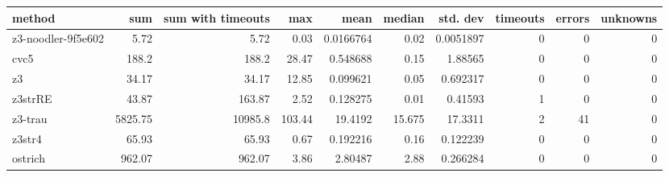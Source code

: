 \begin{tabular}{lrrrrrrrrr}
\hline
 method             &     sum &   sum with timeouts &    max &       mean &   median &   std. dev &   timeouts &   errors &   unknowns \\
\hline
 z3-noodler-9f5e602 &    5.72 &                5.72 &   0.03 &  0.0166764 &    0.02  &  0.0051897 &          0 &        0 &          0 \\
 cvc5               &  188.2  &              188.2  &  28.47 &  0.548688  &    0.15  &  1.88565   &          0 &        0 &          0 \\
 z3                 &   34.17 &               34.17 &  12.85 &  0.099621  &    0.05  &  0.692317  &          0 &        0 &          0 \\
 z3strRE            &   43.87 &              163.87 &   2.52 &  0.128275  &    0.01  &  0.41593   &          1 &        0 &          0 \\
 z3-trau            & 5825.75 &            10985.8  & 103.44 & 19.4192    &   15.675 & 17.3311    &          2 &       41 &          0 \\
 z3str4             &   65.93 &               65.93 &   0.67 &  0.192216  &    0.16  &  0.122239  &          0 &        0 &          0 \\
 ostrich            &  962.07 &              962.07 &   3.86 &  2.80487   &    2.88  &  0.266284  &          0 &        0 &          0 \\
\hline
\end{tabular}
